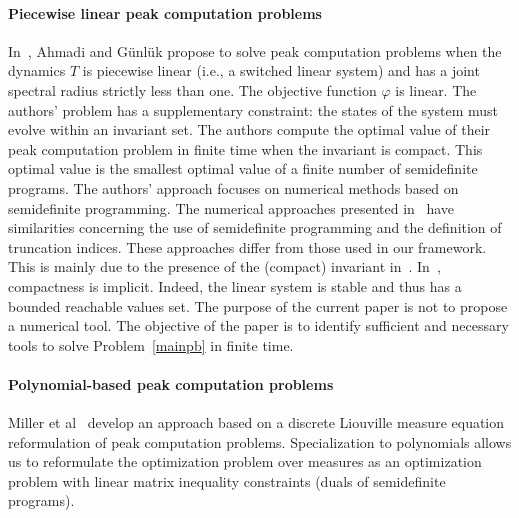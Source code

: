\documentclass{article}
\def\blue#1{#1}
\begin{document}
\paragraph{Piecewise linear peak computation problems}
\blue{
In~\cite{ahmadi2025robust}, Ahmadi and Günlük propose to solve peak computation problems when the dynamics $T$ is piecewise linear (i.e., a switched linear system) and has a joint spectral radius strictly less than one. The objective function $\varphi$ is linear. The authors' problem has a supplementary constraint: the states of the system must evolve within an invariant set. The authors compute the optimal value of their peak computation problem in finite time when the invariant is compact. This optimal value is the smallest optimal value of a finite number of semidefinite programs. The authors' approach focuses on numerical methods based on semidefinite programming. The numerical approaches presented in~\cite{DBLP:journals/jota/Adje21,adje13052025} have similarities concerning the use of semidefinite programming and the definition of truncation indices. These approaches differ from those used in our framework. This is mainly due to the presence of the (compact) invariant in~\cite{ahmadi2025robust}. In~\cite{DBLP:journals/jota/Adje21,adje13052025}, compactness is implicit. Indeed, the linear system is stable and thus has a bounded reachable values set. The purpose of the current paper is not to propose a numerical tool. The objective of the paper is to identify sufficient and necessary tools to solve Problem~\eqref{mainpb} in finite time.
}

\paragraph{Polynomial-based peak computation problems}

\blue{	
	Miller et al~\cite{miller2021peakdiscrete} develop an approach based on a discrete Liouville measure equation reformulation of peak computation problems. Specialization to polynomials allows us to reformulate the optimization problem over measures as an optimization problem with linear matrix inequality constraints (duals of semidefinite programs). 
}
\end{document}
